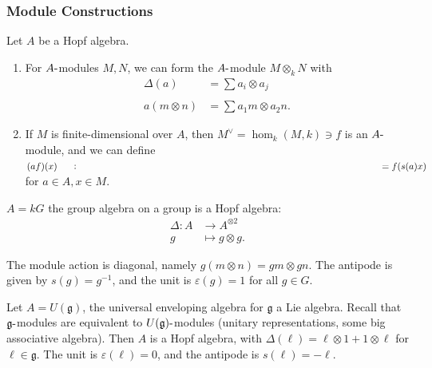 \hypertarget{module-constructions}{%
\subsubsection{Module Constructions}\label{module-constructions}}

Let \(A\) be a Hopf algebra.

\begin{enumerate}
\def\labelenumi{\arabic{enumi}.}
\item
  For \(A{\hbox{-}}\)modules \(M, N\), we can form the
  \(A{\hbox{-}}\)module \(M\otimes_k N\) with
  \begin{align*}       \Delta(a) &= \sum a_i \otimes a_j \\ \\     a(m\otimes n) &= \sum a_1 m \otimes a_2 n     .\end{align*}
\item
  If \(M\) is finite-dimensional over \(A\), then
  \(M^\vee= \hom_k(M, k) \ni f\) is an \(A{\hbox{-}}\)module, and we can
  define \((af)(x) \mathrel{\vcenter{:}}= f(s(a)x)\) for
  \(a\in A, x\in M\).
\end{enumerate}

\begin{example}

\begin{example}

\(A = kG\) the group algebra on a group is a Hopf algebra:
\begin{align*}   \Delta: A &\to A^{\otimes 2} \\ g &\mapsto g\otimes g .\end{align*}

The module action is diagonal, namely \(g(m\otimes n) = gm \otimes gn\).
The antipode is given by \(s(g) = g^{-1}\), and the unit is
\(\varepsilon(g) = 1\) for all \(g\in G\).

\end{example}

\end{example}

\begin{example}

\begin{example}

Let \(A = U({\mathfrak{g}})\), the universal enveloping algebra for
\({\mathfrak{g}}\) a Lie algebra. Recall that
\({\mathfrak{g}}{\hbox{-}}\)modules are equivalent to
\(U({\mathfrak{g}}){\hbox{-}}\)modules (unitary representations, some
big associative algebra). Then \(A\) is a Hopf algebra, with
\(\Delta(\ell) = \ell\otimes 1 + 1\otimes\ell\) for
\(\ell \in {\mathfrak{g}}\). The unit is \(\varepsilon(\ell) = 0\), and
the antipode is \(s(\ell) = -\ell\).

\end{example}

\end{example}


